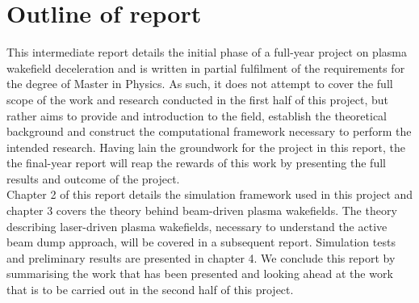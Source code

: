 \section{Outline of report}
This intermediate report details the initial phase of a full-year project on plasma wakefield deceleration and is written in partial fulfilment of the requirements for the degree of Master in Physics. As such, it does not attempt to cover the full scope of the work and research conducted in the first half of this project, but rather aims to provide and introduction to the field, establish the theoretical background and construct the computational framework necessary to perform the intended research. Having lain the groundwork for the project in this report, the the final-year report will reap the rewards of this work by presenting the full results and outcome of the project. \\
\indent Chapter 2 of this report details the simulation framework used in this project and  chapter 3 covers the theory behind beam-driven plasma wakefields. The theory describing laser-driven plasma wakefields, necessary to understand the active beam dump approach, will be covered in a subsequent report. Simulation tests and preliminary results are presented in chapter 4. We conclude this report by summarising the work that has been presented and looking ahead at the work that is to be carried out in the second half of this project.












